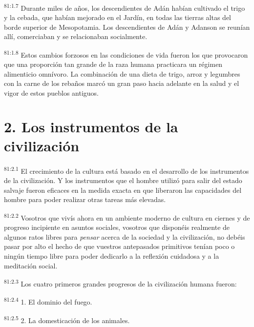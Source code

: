 \par
\textsuperscript{81:1.7} Durante miles de años, los descendientes de Adán habían cultivado el trigo y la cebada, que habían mejorado en el Jardín, en todas las tierras altas del borde superior de Mesopotamia. Los descendientes de Adán y Adanson se reunían allí, comerciaban y se relacionaban socialmente.

\par
\textsuperscript{81:1.8} Estos cambios forzosos en las condiciones de vida fueron los que provocaron que una proporción tan grande de la raza humana practicara un régimen alimenticio omnívoro. La combinación de una dieta de trigo, arroz y legumbres con la carne de los rebaños marcó un gran paso hacia adelante en la salud y el vigor de estos pueblos antiguos.

\section*{2. Los instrumentos de la civilización}
\par
\textsuperscript{81:2.1} El crecimiento de la cultura está basado en el desarrollo de los instrumentos de la civilización. Y los instrumentos que el hombre utilizó para salir del estado salvaje fueron eficaces en la medida exacta en que liberaron las capacidades del hombre para poder realizar otras tareas más elevadas.

\par
\textsuperscript{81:2.2} Vosotros que vivís ahora en un ambiente moderno de cultura en ciernes y de progreso incipiente en asuntos sociales, vosotros que disponéis realmente de algunos ratos libres para \textit{pensar} acerca de la sociedad y la civilización, no debéis pasar por alto el hecho de que vuestros antepasados primitivos tenían poco o ningún tiempo libre para poder dedicarlo a la reflexión cuidadosa y a la meditación social.

\par
\textsuperscript{81:2.3} Los cuatro primeros grandes progresos de la civilización humana fueron:

\par
\textsuperscript{81:2.4} 1. El dominio del fuego.

\par
\textsuperscript{81:2.5} 2. La domesticación de los animales.

